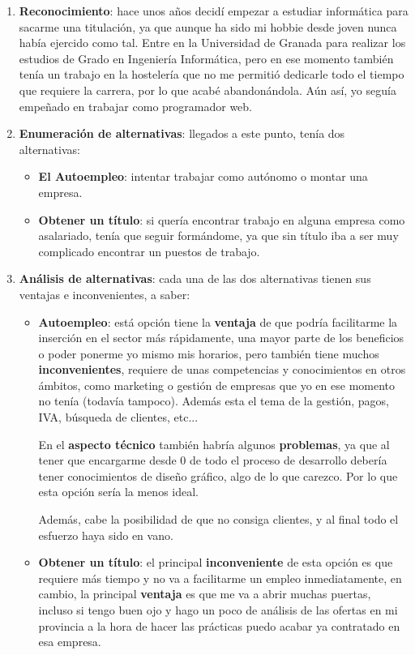 \begin{enumerate}
    \item \textbf{Reconocimiento}: hace unos años decidí empezar a estudiar informática para sacarme una titulación, ya que aunque ha sido mi hobbie desde joven nunca había ejercido como tal. Entre en la Universidad de Granada para realizar los estudios de Grado en Ingeniería Informática, pero en ese momento también tenía un trabajo en la hostelería que no me permitió dedicarle todo el tiempo que requiere la carrera, por lo que acabé abandonándola. Aún así, yo seguía empeñado en trabajar como programador web.

    \item \textbf{Enumeración de alternativas}: llegados a este punto, tenía dos alternativas:
    \begin{itemize}
        \item \textbf{El Autoempleo}: intentar trabajar como autónomo o montar una empresa.
        \item \textbf{Obtener un título}: si quería encontrar trabajo en alguna empresa como asalariado, tenía que seguir formándome, ya que sin título iba a ser muy complicado encontrar un puestos de trabajo.
    \end{itemize}

    \item \textbf{Análisis de alternativas}: cada una de las dos alternativas tienen sus ventajas e inconvenientes, a saber:
    \begin{itemize}
       \item \textbf{Autoempleo}: está opción tiene la \textbf{ventaja} de que podría facilitarme la inserción en el sector más rápidamente, una mayor parte de los beneficios o poder ponerme yo mismo mis horarios, pero también tiene muchos \textbf{inconvenientes}, requiere de unas competencias y conocimientos en otros ámbitos, como marketing o gestión de empresas que yo en ese momento no tenía (todavía tampoco). Además esta el tema de la gestión, pagos, IVA, búsqueda de clientes, etc...

       En el \textbf{aspecto técnico} también habría algunos \textbf{problemas}, ya que al tener que encargarme desde 0 de todo el proceso de desarrollo debería tener conocimientos de diseño gráfico, algo de lo que carezco. Por lo que esta opción sería la menos ideal.

       Además, cabe la posibilidad de que no consiga clientes, y al final todo el esfuerzo haya sido en vano.

       \item \textbf{Obtener un título}: el principal \textbf{inconveniente} de esta opción es que requiere más tiempo y no va a facilitarme un empleo inmediatamente, en cambio, la principal \textbf{ventaja} es que me va a abrir muchas puertas, incluso si tengo buen ojo y hago un poco de análisis de las ofertas en mi provincia a la hora de hacer las prácticas puedo acabar ya contratado en esa empresa.


\end{itemize}
\end{enumerate}
